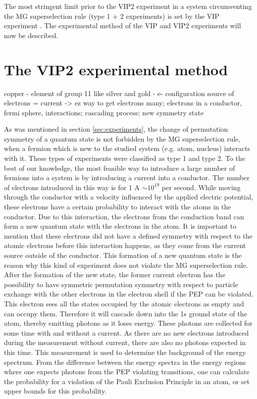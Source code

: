 The most stringent limit prior to the VIP2 experiment in a system circumventing the MG superselection rule (type 1 + 2 experiments) is set by the VIP experiment \cite{Curceanu2011}. The experimental method of the VIP and VIP2 experiments will now be described.

\section{The VIP2 experimental method}

copper - element of group 11 like silver and gold - e- configuration
source of electrons = current -> ez way to get electrons many; 
electrons in a conductor, fermi sphere, interactions; cascading process; 
new symmetry state

As was mentioned in section \ref{sec:experiments}, the change of permutation symmetry of a quantum state is not forbidden by the MG superselection rule, when a fermion which is new to the studied system (e.g. atom, nucleus) interacts with it. These types of experiments were classified as type 1 and type 2. To the best of our knowledge, the most feasible way to introduce a large number of fermions into a system is by introducing a current into a conductor. The number of electrons introduced in this way is for 1 A $\sim 10^{19}$ per second. While moving through the conductor with a velocity influenced by the applied electric potential, these electrons have a certain probability to interact with the atoms in the conductor. Due to this interaction, the electrons from the conduction band can form a new quantum state with the electrons in the atom. It is important to mention that these electrons did not have a defined symmetry with respect to the atomic electrons before this interaction happens, as they come from the current source outside of the conductor. This formation of a new quantum state is the reason why this kind of experiment does not violate the MG superselection rule. After the formation of the new state, the former current electron has the possibility to have symmetric permutation symmetry with respect to particle exchange with the other electrons in the electron shell if the PEP can be violated. This electron sees all the states occupied by the atomic electrons as empty and can occupy them. Therefore it will cascade down into the 1s ground state of the atom, thereby emitting photons as it loses energy. These photons are collected for some time with and without a current. As there are no new electrons introduced during the measurement without current, there are also no photons expected in this time. This measurement is used to determine the background of the energy spectrum. From the difference between the energy spectra in the energy regions where one expects photons from the PEP violating transitions, one can calculate the probability for a violation of the Pauli Exclusion Principle in an atom, or set upper bounds for this probability.

